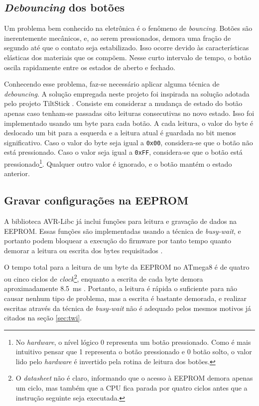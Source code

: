 \documentclass[brazil,pagestart=firstchapter]{abnt}
\begin{document}
\subsection{\textit{Debouncing} dos botões}
\label{sub:debouncing}

Um problema bem conhecido na eletrônica é o fenômeno de \textit{bouncing}.
Botões são inerentemente mecânicos, e, ao serem pressionados, demora uma
fração de segundo até que o contato seja estabilizado. Isso ocorre devido às
características elásticas dos materiais que os compõem. Nesse curto
intervalo de tempo, o botão oscila rapidamente entre os estados de aberto e
fechado.

Conhecendo esse problema, faz-se necessário aplicar alguma técnica de
\textit{debouncing}. A solução empregada neste projeto foi inspirada na
solução adotada pelo projeto TiltStick \cite{TiltStick}. Consiste em
considerar a mudança de estado do botão apenas caso tenham-se passadas oito
leituras consecutivas no novo estado. Isso foi implementado usando um byte
para cada botão. A cada leitura, o valor do byte é deslocado um bit para a
esquerda e a leitura atual é guardada no bit menos significativo. Caso o
valor do byte seja igual a \texttt{0x00}, considera-se que o botão não está
pressionado. Caso o valor seja igual a \texttt{0xFF}, considera-se que o
botão está pressionado\footnote{
	No \textit{hardware}, o nível lógico 0 representa um botão pressionado.
	Como é mais intuitivo pensar que 1 representa o botão pressionado e 0
	botão solto, o valor lido pelo \textit{hardware} é invertido pela rotina
	de leitura dos botões.
}. Qualquer outro valor é ignorado, e o botão mantém o estado anterior.


\subsection{Gravar configurações na EEPROM}
\label{sub:eeprom}

A biblioteca AVR-Libc já inclui funções para leitura e gravação de dados na
\ac{EEPROM}. Essas funções são implementadas usando a técnica de
\textit{busy-wait}, e portanto podem bloquear a execução do firmware por
tanto tempo quanto demorar a leitura ou escrita dos bytes requisitados
\cite{avrlibceeprom}.

O tempo total para a leitura de um byte da \ac{EEPROM} no ATmega8 é de
quatro ou cinco ciclos de \textit{clock}\footnote{
	O \textit{datasheet} não é claro, informando que o acesso à \ac{EEPROM}
	demora apenas um ciclo, mas também que a CPU fica parada por quatro
	ciclos antes que a instrução seguinte seja executada.
}, enquanto a escrita de cada byte demora aproximadamente
\SI{8.5}{\milli\second} \cite{ATmega8}. Portanto, a leitura é rápida
o suficiente para não causar nenhum tipo de problema, mas a escrita
é bastante demorada, e realizar escritas através da técnica de
\textit{busy-wait} não é adequado pelos mesmos motivos já citados na seção
\ref{sec:twi}.
\end{document}
